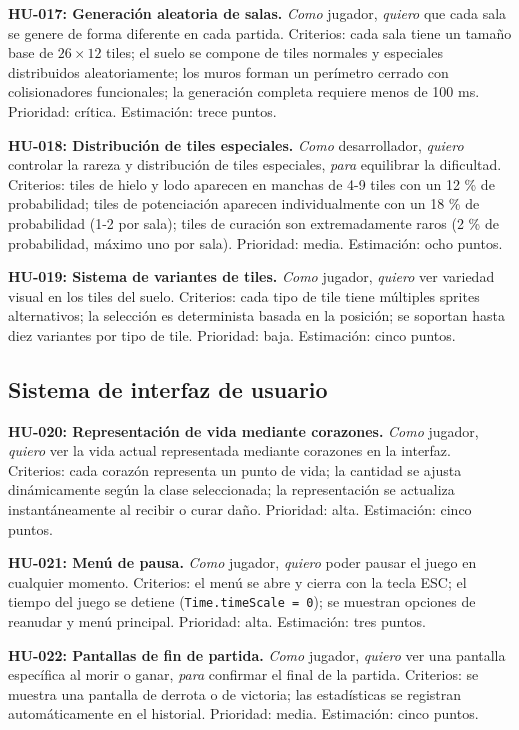 \textbf{HU-017: Generación aleatoria de salas.}
\textit{Como} jugador, \textit{quiero} que cada sala se genere de forma diferente en cada partida. Criterios: cada sala tiene un tamaño base de $26 \times 12$ tiles; el suelo se compone de tiles normales y especiales distribuidos aleatoriamente; los muros forman un perímetro cerrado con colisionadores funcionales; la generación completa requiere menos de 100 ms. Prioridad: crítica. Estimación: trece puntos.

\textbf{HU-018: Distribución de tiles especiales.}
\textit{Como} desarrollador, \textit{quiero} controlar la rareza y distribución de tiles especiales, \textit{para} equilibrar la dificultad. Criterios: tiles de hielo y lodo aparecen en manchas de 4-9 tiles con un 12 \% de probabilidad; tiles de potenciación aparecen individualmente con un 18 \% de probabilidad (1-2 por sala); tiles de curación son extremadamente raros (2 \% de probabilidad, máximo uno por sala). Prioridad: media. Estimación: ocho puntos.

\textbf{HU-019: Sistema de variantes de tiles.}
\textit{Como} jugador, \textit{quiero} ver variedad visual en los tiles del suelo. Criterios: cada tipo de tile tiene múltiples sprites alternativos; la selección es determinista basada en la posición; se soportan hasta diez variantes por tipo de tile. Prioridad: baja. Estimación: cinco puntos.

\subsection{Sistema de interfaz de usuario}


\textbf{HU-020: Representación de vida mediante corazones.}
\textit{Como} jugador, \textit{quiero} ver la vida actual representada mediante corazones en la interfaz. Criterios: cada corazón representa un punto de vida; la cantidad se ajusta dinámicamente según la clase seleccionada; la representación se actualiza instantáneamente al recibir o curar daño. Prioridad: alta. Estimación: cinco puntos.

\textbf{HU-021: Menú de pausa.}
\textit{Como} jugador, \textit{quiero} poder pausar el juego en cualquier momento. Criterios: el menú se abre y cierra con la tecla ESC; el tiempo del juego se detiene (\texttt{Time.timeScale = 0}); se muestran opciones de reanudar y menú principal. Prioridad: alta. Estimación: tres puntos.

\textbf{HU-022: Pantallas de fin de partida.}
\textit{Como} jugador, \textit{quiero} ver una pantalla específica al morir o ganar, \textit{para} confirmar el final de la partida. Criterios: se muestra una pantalla de derrota o de victoria; las estadísticas se registran automáticamente en el historial. Prioridad: media. Estimación: cinco puntos.

